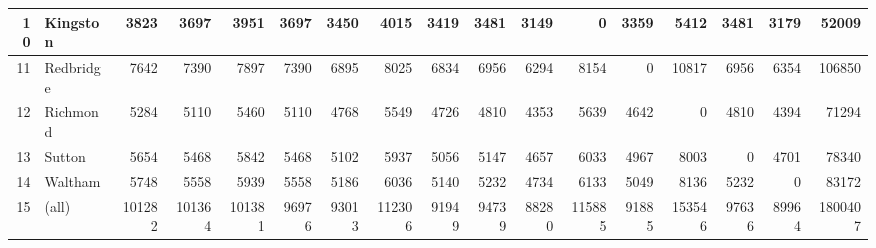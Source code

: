 \documentclass[11pt]{article} %
\begin{document}
\begin{table}
\begin{tabular}{|r|l|r|r|r|r|r|r|r|r|r|r|r|r|r|r|r|}
10 & Kingston & 3823 & 3697 & 3951 & 3697 & 3450 & 4015 & 3419 & 3481 & 3149 & 0 & 3359 & 5412 & 3481 & 3179 & 52009 \\ \hline
11 & Redbridge & 7642 & 7390 & 7897 & 7390 & 6895 & 8025 & 6834 & 6956 & 6294 & 8154 & 0 & 10817 & 6956 & 6354 & 106850 \\ \hline
12 & Richmond & 5284 & 5110 & 5460 & 5110 & 4768 & 5549 & 4726 & 4810 & 4353 & 5639 & 4642 & 0 & 4810 & 4394 & 71294 \\ \hline
13 & Sutton & 5654 & 5468 & 5842 & 5468 & 5102 & 5937 & 5056 & 5147 & 4657 & 6033 & 4967 & 8003 & 0 & 4701 & 78340 \\ \hline
14 & Waltham & 5748 & 5558 & 5939 & 5558 & 5186 & 6036 & 5140 & 5232 & 4734 & 6133 & 5049 & 8136 & 5232 & 0 & 83172 \\ \hline
15 & (all) & 101282 & 101364 & 101381 & 96976 & 93013 & 112306 & 91949 & 94739 & 88280 & 115885 & 91885 & 153546 & 97636 & 89964 & 1800407 \\ \hline
\end{tabular}
\label{Estimated Flows}
\end{table}


\end{document}
